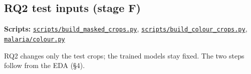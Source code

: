 \documentclass[11pt,a4paper]{article}
\begin{document}
\subsection{RQ2 test inputs (stage F)}

\textbf{Scripts:} \href{https://github.com/noahtjonsk/malaria-cross-dataset/blob/main/scripts/build_masked_crops.py}{\texttt{scripts/\allowbreak{}build\_\allowbreak{}masked\_\allowbreak{}crops.\allowbreak{}py}}, \href{https://github.com/noahtjonsk/malaria-cross-dataset/blob/main/scripts/build_colour_crops.py}{\texttt{scripts/\allowbreak{}build\_\allowbreak{}colour\_\allowbreak{}crops.\allowbreak{}py}}, \href{https://github.com/noahtjonsk/malaria-cross-dataset/blob/main/malaria/colour.py}{\texttt{malaria/\allowbreak{}colour.\allowbreak{}py}}

RQ2 changes only the test crops; the trained models stay fixed. The two steps follow from the EDA (\S{}4).
\end{document}
